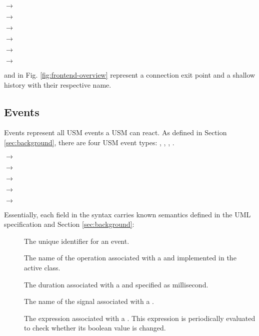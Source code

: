  $\rightarrow$ 

 $\rightarrow$ 

 $\rightarrow$ 

 $\rightarrow$ 

 $\rightarrow$ 

 $\rightarrow$ 

\noindent
{}

 and  in Fig. \ref{fig:frontend-overview} represent a connection exit point and a shallow history with their respective name.  

\subsection{Events}
Events represent all USM events a USM can react.
As defined in Section \ref{sec:background}, there are four USM event types: , , , . %

\noindent
{}

 $\rightarrow$  

 $\rightarrow$  

 $\rightarrow$  

 $\rightarrow$  

 $\rightarrow$  

\noindent
{}
Essentially, each field in the syntax carries known semantics defined in the UML specification and Section \ref{sec:background}:
\begin{description}
	\item[] The unique identifier for an event.
	
	\item[] The name of the operation associated with a  and implemented in the active class. 
	
	\item[] The duration associated with a  and specified as millisecond.
	
	\item[] The name of the signal associated with a .
	
	\item[] The expression associated with a . This expression is periodically evaluated to check whether its boolean value is changed.
\end{description}

